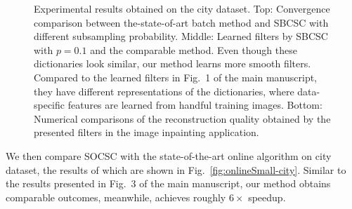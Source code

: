 \documentclass[10pt,twocolumn,letterpaper]{article}
\begin{document}
\begin{figure}[h]

\caption{Experimental results obtained on the city dataset. Top: Convergence comparison between the-state-of-art batch method and SBCSC with different subsampling probability. Middle: Learned filters by SBCSC with $p=0.1$ and the comparable method. Even though these dictionaries look similar, our method learns more smooth filters. Compared to the learned filters in Fig.~1 of the main manuscript, they have different representations of the dictionaries, where data-specific features are learned from handful training images. Bottom: Numerical comparisons of the reconstruction quality obtained by the presented filters in the image inpainting application.}
\label{fig:subsampleResult-city}
\end{figure}

We then compare SOCSC with the state-of-the-art online algorithm on city dataset, the results of which are shown in Fig.\ \ref{fig:onlineSmall-city}. Similar to the results presented in Fig.~3 of the main manuscript, our method obtains comparable outcomes, meanwhile, achieves roughly $6 \times$ speedup.
\end{document}
